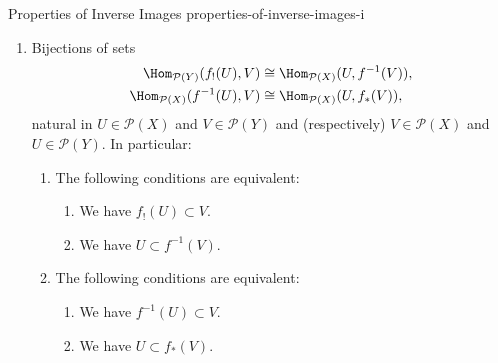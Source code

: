 \begin{proposition}{Properties of Inverse Images \rmI}{properties-of-inverse-images-i}
\begin{enumerate}
\begin{enumerate}
\begin{itemize}
                        \item For each $U\in\mathcal{P}(X)$, we have $f^{-1}(f_{*}(U))\subset U$.
                        \item For each $V\in\mathcal{P}(Y)$, we have $f_{!}(f^{-1}(V))\subset V$.
                        \item For each $V\in\mathcal{P}(Y)$, we have $V\subset f_{*}(f^{-1}(V))$.
                    \end{itemize}
                \item\label{properties-of-inverse-images-i-triple-adjointness-2}Bijections of sets
                    \begin{align*}
                        \Hom_{\mathcal{P}(Y)}(f_{!}(U),V)  &\cong \Hom_{\mathcal{P}(X)}(U,f^{-1}(V)),\\
                        \Hom_{\mathcal{P}(X)}(f^{-1}(U),V) &\cong \Hom_{\mathcal{P}(X)}(U,f_{*}(V)),
                    \end{align*}
                    natural in $U\in\mathcal{P}(X)$ and $V\in\mathcal{P}(Y)$ and (respectively) $V\in\mathcal{P}(X)$ and $U\in\mathcal{P}(Y)$. In particular:
                    \begin{enumerate}
                        \item\label{properties-of-inverse-images-i-triple-adjointness-2-a}The following conditions are equivalent:
                            \begin{enumerate}
                                \item\label{properties-of-inverse-images-i-triple-adjointness-2-a-i}We have $f_{!}(U)\subset V$.
                                \item\label{properties-of-inverse-images-i-triple-adjointness-2-a-ii}We have $U\subset f^{-1}(V)$.
                            \end{enumerate}
                        \item\label{properties-of-inverse-images-i-triple-adjointness-2-b}The following conditions are equivalent:
                            \begin{enumerate}
                                \item\label{properties-of-inverse-images-i-triple-adjointness-2-b-i}We have $f^{-1}(U)\subset V$.
                                \item\label{properties-of-inverse-images-i-triple-adjointness-2-b-ii}We have $U\subset f_{*}(V)$.
                            \end{enumerate}

\end{enumerate}
\end{enumerate}
\end{enumerate}
\end{proposition}
